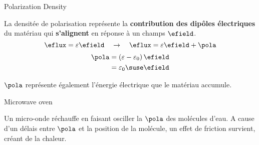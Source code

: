\begin{frame}{Polarization Density}
    \begin{twocolumns}[0.6]
        \leftcol
        La densitée de polarisation représente la \textbf{contribution des dipôles électriques} du matériau qui \textbf{s'alignent} en réponse à un champs $\efield$.
        \begin{equation*}
            \eflux = \varepsilon \efield \hspace{1em} \rightarrow \hspace{1em} \eflux = \varepsilon \efield + \pola
        \end{equation*}
        \vspace{10pt}
        \begin{equation*}
            \begin{aligned}
                \pola &=  \left(\varepsilon - \varepsilon_0 \right) \efield\\
                &= \varepsilon_0 \suse \efield
            \end{aligned}
        \end{equation*}
        \rightcol
    \end{twocolumns}
    \centering
    $\pola$ représente également l'énergie électrique que le matériau accumule.
\end{frame}

\begin{frame}{Microwave oven}
    \begin{twocolumns}[0.6]
        \leftcol
        \rightcol
    \end{twocolumns}
    \centering
    \vspace{-20pt}
    Un micro-onde réchauffe en faisant osciller la $\pola$ des molécules d'eau. A cause d'un délais entre $\pola$ et la position de la molécule, un effet de friction survient, créant de la chaleur. 
\end{frame}

